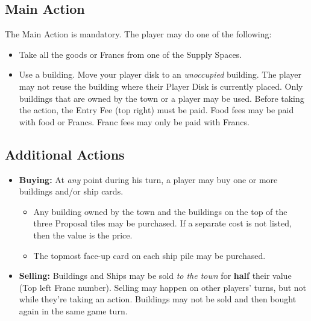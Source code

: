 \documentclass[12pt]{article}
\newenvironment{itemizeCustom}
{\begin{itemize}
  \setlength{\itemsep}{1pt}
  \setlength{\parskip}{0pt}
  \setlength{\parsep}{0pt}}
{\end{itemize}}
\begin{document}
\begin{multicols*}{2}
\subsection*{Main Action}
The Main Action is mandatory. The player may do one of the following:
\begin{itemizeCustom}
	\item Take all the goods or Francs from one of the Supply Spaces.
	\item Use a building. Move your player disk to an \emph{unoccupied} building. The player may not reuse the building where their Player Disk is currently placed. Only buildings that are owned by the town or a player may be used. Before taking the action, the Entry Fee (top right) must be paid. Food fees may be paid with food or Francs. Franc fees may only be paid with Francs.
\end{itemizeCustom}

\subsection*{Additional Actions}
\begin{itemizeCustom}
	\item \textbf{Buying:} At \emph{any} point during his turn, a player may buy one or more buildings and/or ship cards.
		\begin{itemizeCustom}
			\item Any building owned by the town and the buildings on the top of the three Proposal tiles may be purchased. If a separate cost is not listed, then the value is the price.
			\item The topmost face-up card on each ship pile may be purchased.
		\end{itemizeCustom}
	\item \textbf{Selling:} Buildings and Ships may be sold \emph{to the town} for \textbf{half} their value (Top left Franc number). Selling may happen on other players' turns, but not while they're taking an action. Buildings may not be sold and then bought again in the same game turn.
\end{itemizeCustom}


\end{multicols*}
\end{document}
